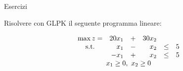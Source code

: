 \documentclass{beamer}
\begin{document}
\generatitolo


\begin{frame}%
{Esercizi}

Risolvere con GLPK il seguente programma lineare:

\begin{enumerate}
{\footnotesize \item
$$\begin{array}{crrrcr}
\max z=& 20 x_1 &+& 30 x_2\\
{\rm s.t.} &  x_1 &-&  x_2 & \leq & 5 \\
           &- x_1 &+&  x_2 & \leq & 5  \\
           \multicolumn{6}{c}{x_1 \geq 0,\ x_2 \geq 0}
\end{array}%
$$%
}
\end{enumerate}

\end{frame}
\end{document}
